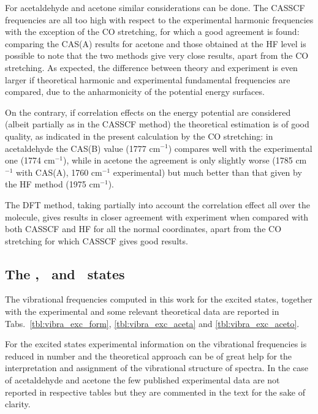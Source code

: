

For acetaldehyde and acetone similar considerations can be done. The CASSCF
frequencies are all too high with respect to the experimental harmonic
frequencies with the exception of the CO stretching, for which a good
agreement is found: comparing the CAS(A) results for acetone and those
obtained at the HF level \cite{jms-550-281-2000} is possible to note that
the two methods give very close results, apart from the CO stretching. As
expected, the difference between theory and experiment is even larger if
theoretical harmonic and experimental fundamental frequencies are compared,
due to the anharmonicity of the potential energy surfaces.  



On the contrary, if correlation effects on the energy potential are
considered (albeit partially as in the CASSCF method) the theoretical
estimation is of good quality, as indicated in the present calculation by
the CO stretching: in acetaldehyde the CAS(B) value (1777 cm$^{-1}$)
compares well with the experimental one (1774 cm$^{-1}$), while in acetone
the agreement is only slightly worse (1785 cm$^{-1}$ with CAS(A), 1760
cm$^{-1}$ experimental) but much better than that given by the HF method
(1975 cm$^{-1}$). 

The DFT method, taking partially into account the correlation effect all
over the molecule, gives results \cite{jcp-111-205-1999,jms-550-281-2000} in
closer agreement with experiment when compared with both CASSCF and HF for
all the normal coordinates, apart from the CO stretching for which CASSCF
gives good results. 

\subsection*{The \npi, \pipi\ and \spi\ states}
The vibrational frequencies computed in this work for the excited states,
together with the experimental and some relevant theoretical data are
reported in Tabs.~\ref{tbl:vibra_exc_form}, \ref{tbl:vibra_exc_aceta} and
\ref{tbl:vibra_exc_aceto}.

For the excited states experimental information on the vibrational
frequencies is reduced in number and the theoretical approach can be of
great help for the interpretation and assignment of the vibrational
structure of spectra.  In the case of acetaldehyde and acetone the few
published experimental data are not reported in respective tables but they
are commented in the text for the sake of clarity. 

